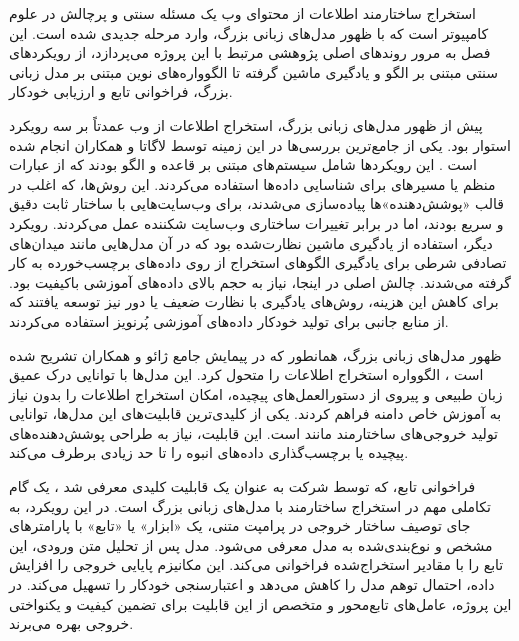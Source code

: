 

استخراج ساختارمند اطلاعات از محتوای وب یک مسئله سنتی و پرچالش در علوم کامپیوتر است که با ظهور مدل‌های زبانی بزرگ، وارد مرحله جدیدی شده است. این فصل به مرور روندهای اصلی پژوهشی مرتبط با این پروژه می‌پردازد، از رویکردهای سنتی مبتنی بر الگو و یادگیری ماشین گرفته تا الگوواره‌های نوین مبتنی بر مدل زبانی بزرگ، فراخوانی تابع و ارزیابی خودکار.


پیش از ظهور مدل‌های زبانی بزرگ، استخراج اطلاعات از وب عمدتاً بر سه رویکرد استوار بود. یکی از جامع‌ترین بررسی‌ها در این زمینه توسط لاگاتا و همکاران انجام شده است \cite{laGatta2012web}. این رویکردها شامل سیستم‌های مبتنی بر قاعده و الگو بودند که از عبارات منظم یا مسیرهای  برای شناسایی داده‌ها استفاده می‌کردند. این روش‌ها، که اغلب در قالب «پوشش‌دهنده»ها پیاده‌سازی می‌شدند، برای وب‌سایت‌هایی با ساختار ثابت دقیق و سریع بودند، اما در برابر تغییرات ساختاری وب‌سایت شکننده عمل می‌کردند. رویکرد دیگر، استفاده از یادگیری ماشین نظارت‌شده بود که در آن مدل‌هایی مانند میدان‌های تصادفی شرطی برای یادگیری الگوهای استخراج از روی داده‌های برچسب‌خورده به کار گرفته می‌شدند. چالش اصلی در اینجا، نیاز به حجم بالای داده‌های آموزشی باکیفیت بود. برای کاهش این هزینه، روش‌های یادگیری با نظارت ضعیف یا دور نیز توسعه یافتند که از منابع جانبی برای تولید خودکار داده‌های آموزشی پُرنویز استفاده می‌کردند.


ظهور مدل‌های زبانی بزرگ، همانطور که در پیمایش جامع ژائو و همکاران تشریح شده است \cite{zhao2023survey}، الگوواره استخراج اطلاعات را متحول کرد. این مدل‌ها با توانایی درک عمیق زبان طبیعی و پیروی از دستورالعمل‌های پیچیده، امکان استخراج اطلاعات را بدون نیاز به آموزش خاص دامنه فراهم کردند. یکی از کلیدی‌ترین قابلیت‌های این مدل‌ها، توانایی تولید خروجی‌های ساختارمند مانند  است. این قابلیت، نیاز به طراحی پوشش‌دهنده‌های پیچیده یا برچسب‌گذاری داده‌های انبوه را تا حد زیادی برطرف می‌کند.


فراخوانی تابع، که توسط شرکت  به عنوان یک قابلیت کلیدی معرفی شد \cite{open2023function}، یک گام تکاملی مهم در استخراج ساختارمند با مدل‌های زبانی بزرگ است. در این رویکرد، به جای توصیف ساختار خروجی در پرامپت متنی، یک «ابزار» یا «تابع» با پارامترهای مشخص و نوع‌بندی‌شده به مدل معرفی می‌شود. مدل پس از تحلیل متن ورودی، این تابع را با مقادیر استخراج‌شده فراخوانی می‌کند. این مکانیزم پایایی خروجی را افزایش داده، احتمال توهم مدل را کاهش می‌دهد و اعتبارسنجی خودکار را تسهیل می‌کند. در این پروژه، عامل‌های تابع‌محور و متخصص از این قابلیت برای تضمین کیفیت و یکنواختی خروجی بهره می‌برند.


